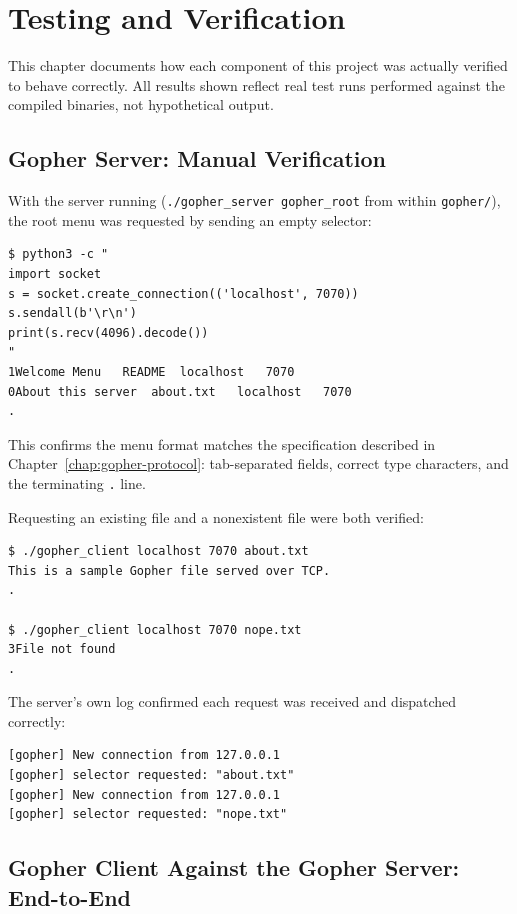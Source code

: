 \chapter{Testing and Verification}
\label{chap:testing}

This chapter documents how each component of this project was actually verified to behave correctly. All results shown reflect real test runs performed against the compiled binaries, not hypothetical output.

\section{Gopher Server: Manual Verification}

With the server running (\texttt{./gopher\_server gopher\_root} from within \texttt{gopher/}), the root menu was requested by sending an empty selector:

\begin{lstlisting}[style=bashstyle, numbers=none]
$ python3 -c "
import socket
s = socket.create_connection(('localhost', 7070))
s.sendall(b'\r\n')
print(s.recv(4096).decode())
"
1Welcome Menu	README	localhost	7070
0About this server	about.txt	localhost	7070
.
\end{lstlisting}

This confirms the menu format matches the specification described in Chapter~\ref{chap:gopher-protocol}: tab-separated fields, correct type characters, and the terminating \texttt{.} line.

Requesting an existing file and a nonexistent file were both verified:

\begin{lstlisting}[style=bashstyle, numbers=none]
$ ./gopher_client localhost 7070 about.txt
This is a sample Gopher file served over TCP.
.

$ ./gopher_client localhost 7070 nope.txt
3File not found
.
\end{lstlisting}

The server's own log confirmed each request was received and dispatched correctly:
\begin{lstlisting}[style=bashstyle, numbers=none]
[gopher] New connection from 127.0.0.1
[gopher] selector requested: "about.txt"
[gopher] New connection from 127.0.0.1
[gopher] selector requested: "nope.txt"
\end{lstlisting}

\section{Gopher Client Against the Gopher Server: End-to-End}

